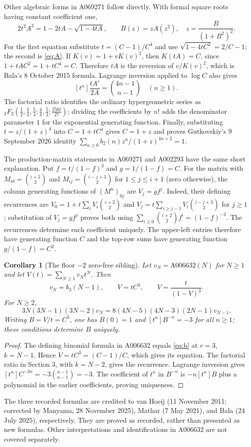 \documentclass[11pt]{article}
\newtheorem{corollary}[theorem]{Corollary}
\begin{document}
Other algebraic forms in A069271 follow directly. With formal square roots
having constant coefficient one,
\begin{equation}\label{eq:otherA}
 2t^2A^3=1-2tA-\sqrt{1-4tA},\qquad
 B(z)=zA(z^2),\quad z=\frac{B}{(1+B^2)^2}.
\end{equation}
For the first equation substitute $t=(C-1)/C^4$ and use
$\sqrt{1-4tC^2}=2/C-1$; the second is \eqref{eq:A}.
If $K(v)=1+vK(v)^2$, then $K(tA)=C$, since
$1+tAC^2=1+tC^4=C$. Therefore $tA$ is the reversion of $v/K(v)^2$,
which is Bala's 8 October 2015 formula. Lagrange inversion applied to
$\log C$ also gives
\[
 [t^n]\frac{tA'}{2A}=\binom{4n-1}{n-1}\quad(n\geq1).
\]
The factorial ratio identifies the ordinary hypergeometric series as
${}_3F_2(\frac12,\frac34,\frac54;\frac43,\frac53;\frac{256t}{27})$;
dividing the coefficients by $n!$ adds the denominator parameter $1$
for the exponential generating function. Finally, substituting
$t=z/(1+z)^4$ into $C=1+tC^4$ gives $C=1+z$ and proves Gutkovskiy's
9 September 2026 identity
$\sum_{n\geq0}b_2(n)z^n/(1+z)^{4n+2}=1$.

The production-matrix statements in A069271 and A002293 have the same
short explanation. Put $f=t/(1-f)^3$ and $g=1/(1-f)=C$.
For the matrix with $M_{i0}=\binom{i+2}{2}$ and
$M_{ij}=\binom{i-j+3}{2}$ for $1\leq j\leq i+1$ (zero otherwise),
the column generating functions of $(M^n)_{0j}$ are $V_j=gf^j$.
Indeed, their defining recurrences are
$V_0=1+t\sum_iV_i\binom{i+2}{2}$ and
$V_j=t\sum_{i\geq j-1}V_i\binom{i-j+3}{2}$ for $j\geq1$;
substitution of $V_j=gf^j$ proves both using
$\sum_{i\geq0}\binom{i+2}{2}f^i=(1-f)^{-3}$.
The recurrences determine each coefficient uniquely. The upper-left
entries therefore have generating function $C$ and the top-row sums
have generating function $g/(1-f)=C^2$.

\begin{corollary}[The floor $-2$ zero-free sibling]\label{cor:thirdpower}
Let $v_N=\mathrm{A006632}(N)$ for $N\geq1$ and let
$V(t)=\sum_{N\geq1}v_Nt^N$. Then
\[
 v_N=b_3(N-1),\qquad V=tC^3,\qquad
 V=\frac{t}{(1-V)^3}.
\]
For $N\geq2$,
\[
 3N(3N-1)(3N-2)v_N
 =8(4N-5)(4N-3)(2N-1)v_{N-1}.
\]
Writing $B=V/t=C^3$, one has $B(0)=1$ and
$[t^n]B^{-n}=-3$ for all $n\geq1$; these conditions determine $B$ uniquely.
\end{corollary}
\begin{proof}
The defining binomial formula in A006632 \cite{oeis7} equals
\eqref{eq:b} at $r=3$, $k=N-1$. Hence $V=tC^3=(C-1)/C$,
which gives its equation. The factorial ratio in Section 3, with
$k=N-2$, gives the recurrence. Lagrange inversion gives
$[t^n]C^{-3n}=-3\binom{n-1}{n-1}=-3$.
The coefficient of $t^n$ in $B^{-n}$ is $-n[t^n]B$ plus a
polynomial in the earlier coefficients, proving uniqueness.
\end{proof}
The three recorded formulas are credited to van Hoeij (11 November 2011;
corrected by Manyama, 28 November 2025), Mathar (7 May 2021), and
Bala (24 July 2025), respectively. They are proved as recorded, rather
than presented as new formulas. Other interpretations and identifications
in A006632 are not covered separately.
\end{document}
